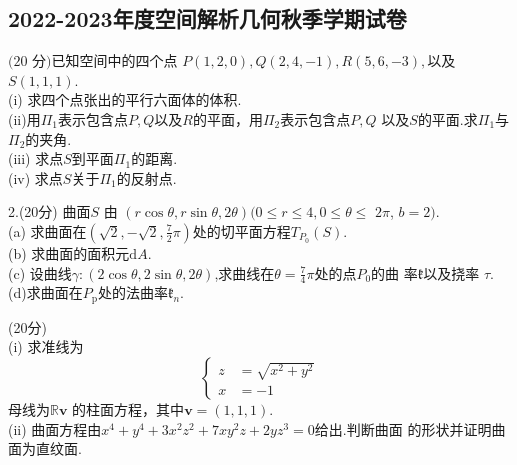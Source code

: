 \subsection{2022-2023年度空间解析几何秋季学期试卷}

\begin{problem}
    $(20\text{ 分)已知空间中的四个点 }P(1,2,0),Q(2,4,-1),R(5,6,-3),$以及$S(1,1,1)$.\\
(i) 求四个点张出的平行六面体的体积.\\
(ii)用$\Pi_1$表示包含点$P,Q$以及$R$的平面，用$\Pi_2$表示包含点$P,Q$
以及$S$的平面.求$\Pi_1$与$\Pi_2$的夹角.\\
(iii) 求点$S$到平面$\Pi_{1}$的距离.\\
(iv) 求点$S$关于$\Pi_{1}$的反射点.
\end{problem}

\begin{solution}
    
\end{solution}

\begin{problem}
    2.(20分) 曲面$S$ 由 $(r\cos\theta,r\sin\theta,2\theta)(0\leq r\leq4,0\leq\theta\leq$
$2\pi$, $b= 2)$.\\
(a) 求曲面在$\displaystyle (\sqrt2,-\sqrt2,\frac72\pi)$处的切平面方程$T_{P_0}(S)$.\\
(b) 求曲面的面积元$\mathrm{d}A$.\\
(c) 设曲线$\gamma:\left(2\cos\theta,2\sin\theta,2\theta\right)$,求曲线在$\displaystyle \theta=\frac74\pi$处的点$P_0$的曲
率$\mathfrak{k}$以及挠率 $\tau$.\\
(d)求曲面在$P_\mathrm{p}$处的法曲率$\mathfrak{k}_n.$
\end{problem}

\begin{solution}
    
\end{solution}

\begin{problem}
    (20分)\\
(i) 求准线为
$$\begin{cases}z&=\sqrt{x^2+y^2}\\x&=-1\end{cases}$$
母线为$\mathbb{R} \mathbf{v}$ 的柱面方程，其中$\mathbf{v}=(1,1,1)$.\\
(ii) 曲面方程由$x^4+y^4+3x^2z^2+7xy^2z+2yz^3=0$给出.判断曲面
的形状并证明曲面为直纹面.
\end{problem}

